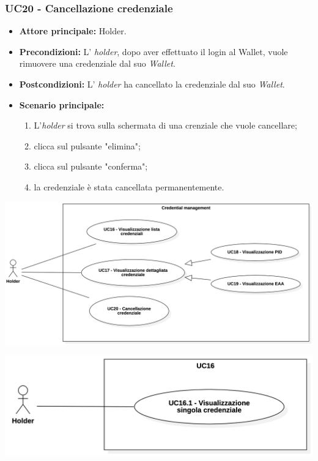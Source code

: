 \subsubsection{UC20 - Cancellazione credenziale}
\begin{itemize}
\item \textbf{Attore principale:} Holder.
\item \textbf{Precondizioni:} L' \textit{holder}, dopo aver effettuato il login al Wallet, vuole rimuovere una credenziale dal suo \textit{Wallet}.
\item \textbf{Postcondizioni:} L' \textit{holder} ha cancellato la credenziale dal suo \textit{Wallet}.
\item \textbf{Scenario principale:} 
    \begin{enumerate}
    \item L'\textit{holder} si trova sulla schermata di una crenziale che vuole cancellare; 
    \item clicca sul pulsante "elimina"; 
    \item clicca sul pulsante "conferma"; 
    \item la credenziale è stata cancellata permanentemente.
    \end{enumerate}
\end{itemize}

\begin{center}
    \includegraphics[scale = 0.23]{./res/img/3Credential_management.png}
  \end{center}
 
  \begin{center}
    \includegraphics[scale = 0.3]{./res/img/3Credential_management_2.png}
  \end{center}

